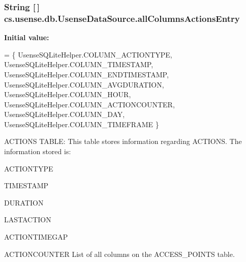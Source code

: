 \subsubsection[{all\+Columns\+Actions\+Entry}]{\setlength{\rightskip}{0pt plus 5cm}String \mbox{[}$\,$\mbox{]} cs.\+usense.\+db.\+Usense\+Data\+Source.\+all\+Columns\+Actions\+Entry\hspace{0.3cm}{\ttfamily [private]}}\label{classcs_1_1usense_1_1db_1_1_usense_data_source_a688543575d053c8e63be693eec2d31ef}
{\bfseries Initial value\+:}
\begin{DoxyCode}
= \{ 
            UsenseSQLiteHelper.COLUMN\_ACTIONTYPE,
            UsenseSQLiteHelper.COLUMN\_TIMESTAMP,
            UsenseSQLiteHelper.COLUMN\_ENDTIMESTAMP,
            UsenseSQLiteHelper.COLUMN\_AVGDURATION,
            UsenseSQLiteHelper.COLUMN\_HOUR,
            UsenseSQLiteHelper.COLUMN\_ACTIONCOUNTER,
            UsenseSQLiteHelper.COLUMN\_DAY,
            UsenseSQLiteHelper.COLUMN\_TIMEFRAME
    \}
\end{DoxyCode}
A\+C\+T\+I\+O\+N\+S T\+A\+B\+L\+E\+: This table stores information regarding A\+C\+T\+I\+O\+N\+S. The information stored is\+:
\begin{DoxyItemize}
\item A\+C\+T\+I\+O\+N\+T\+Y\+P\+E
\item T\+I\+M\+E\+S\+T\+A\+M\+P
\item D\+U\+R\+A\+T\+I\+O\+N
\item L\+A\+S\+T\+A\+C\+T\+I\+O\+N
\item A\+C\+T\+I\+O\+N\+T\+I\+M\+E\+G\+A\+P
\item A\+C\+T\+I\+O\+N\+C\+O\+U\+N\+T\+E\+R List of all columns on the A\+C\+C\+E\+S\+S\+\_\+\+P\+O\+I\+N\+T\+S table. 
\end{DoxyItemize}\hypertarget{classcs_1_1usense_1_1db_1_1_usense_data_source_a0b84e480cbc128dfd1931c07b46c98f6}{}
